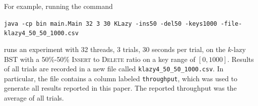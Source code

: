 \documentclass[letterpaper,twocolumn]{article}
\newcommand{\code}[1]{\texttt{#1}}
\begin{document}
For example, running the command
\begin{center}
	\code{java -cp bin main.Main 32 3 30 KLazy -ins50 -del50 -keys1000 -file-klazy4\_50\_50\_1000.csv}
\end{center}
runs an experiment with 32 threads, 3 trials, 30 seconds per trial, on the $k$-lazy BST with a 50\%-50\% \textsc{Insert} to \textsc{Delete} ratio on a key range of $[0,1000]$. Results of all trials are recorded in a new file called \texttt{klazy4\_50\_50\_1000.csv}. In particular, the file contains a column labeled \texttt{throughput}, which was used to generate all results reported in this paper. The reported throughput was the average of all trials.
\end{document}
